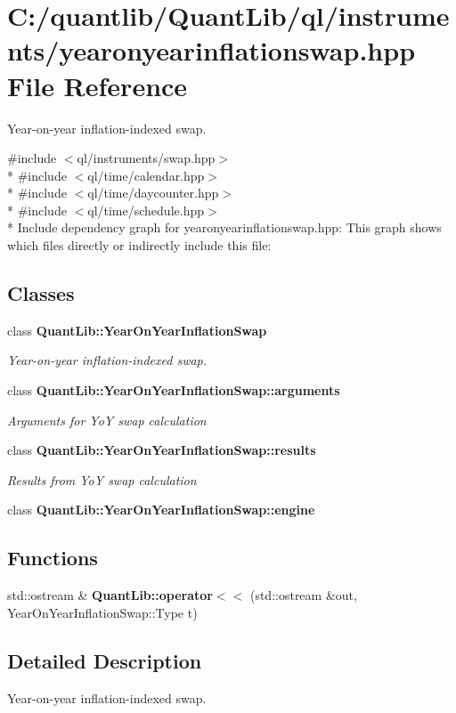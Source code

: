\section{C\+:/quantlib/\+Quant\+Lib/ql/instruments/yearonyearinflationswap.hpp File Reference}
\label{yearonyearinflationswap_8hpp}


Year-\/on-\/year inflation-\/indexed swap.  


{\ttfamily \#include $<$ql/instruments/swap.\+hpp$>$}\\*
{\ttfamily \#include $<$ql/time/calendar.\+hpp$>$}\\*
{\ttfamily \#include $<$ql/time/daycounter.\+hpp$>$}\\*
{\ttfamily \#include $<$ql/time/schedule.\+hpp$>$}\\*
Include dependency graph for yearonyearinflationswap.\+hpp\+:
This graph shows which files directly or indirectly include this file\+:
\subsection*{Classes}
\begin{DoxyCompactItemize}
\item 
class {\bf Quant\+Lib\+::\+Year\+On\+Year\+Inflation\+Swap}
\begin{DoxyCompactList}\small\item\em Year-\/on-\/year inflation-\/indexed swap. \end{DoxyCompactList}\item 
class {\bf Quant\+Lib\+::\+Year\+On\+Year\+Inflation\+Swap\+::arguments}
\begin{DoxyCompactList}\small\item\em Arguments for YoY swap calculation \end{DoxyCompactList}\item 
class {\bf Quant\+Lib\+::\+Year\+On\+Year\+Inflation\+Swap\+::results}
\begin{DoxyCompactList}\small\item\em Results from YoY swap calculation \end{DoxyCompactList}\item 
class {\bf Quant\+Lib\+::\+Year\+On\+Year\+Inflation\+Swap\+::engine}
\end{DoxyCompactItemize}
\subsection*{Functions}
\begin{DoxyCompactItemize}
\item 
std\+::ostream \& {\bfseries Quant\+Lib\+::operator$<$$<$} (std\+::ostream \&out, Year\+On\+Year\+Inflation\+Swap\+::\+Type t)\label{yearonyearinflationswap_8cpp_a8ec7bd1d096550b56b49a45801b7c439}

\end{DoxyCompactItemize}


\subsection{Detailed Description}
Year-\/on-\/year inflation-\/indexed swap. 

